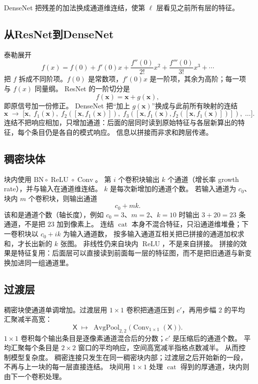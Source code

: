 DenseNet 把残差的加法换成通道维连结，使第 $\ell$ 层看见之前所有层的特征。

\subsection{从ResNet到DenseNet}

泰勒展开
\[
f(x)=f(0)+f'(0)x+\frac{f''(0)}{2!}x^{2}+\frac{f'''(0)}{3!}x^{3}+\cdots
\]
把 $f$ 拆成不同阶项。$f(0)$ 是常数项，$f'(0)x$ 是一阶项，其余为高阶；每一项与 $f(x)$ 同量纲。
ResNet 的一阶切分是
\[
f(\bm{x})=\bm{x}+g(\bm{x}),
\]
即原信号加一份修正。
DenseNet 把“加上 $g(\bm{x})$”换成与此前所有映射的连结
\[
\bm{x}
\;\longrightarrow\;
\bigl[
\bm{x},\;
f_1(\bm{x}),\;
f_2([\bm{x},f_1(\bm{x})]),\;
f_3([\bm{x},f_1(\bm{x}),f_2([\bm{x},f_1(\bm{x})])]),\;
\ldots
\bigr].
\]
连结不把响应相加，只增加通道：后面的层同时读到原始特征与各层新算出的特征，每个条目仍是各自的模式响应。
信息以拼接而非求和跨层传递。

\subsection{稠密块体}

块内使用 $\mathrm{BN}\circ\operatorname{ReLU}\circ\operatorname{Conv}$。
第 $i$ 个卷积块输出 $k$ 个通道（增长率 growth rate），并与输入在通道维连结。
$k$ 是每次新增加的通道个数。
若输入通道为 $c_0$、块内 $m$ 个卷积块，则输出通道
\[
c_0+m k.
\]
该和是通道个数（轴长度），例如 $c_0=3$、$m=2$、$k=10$ 时输出 $3+20=23$ 条通道，不是把 $23$ 加到像素上。
连结 $\operatorname{cat}$ 本身不混合特征，只沿通道维堆叠；下一卷积块以 $c_0+ik$ 为输入通道数，
按多输入通道互相关把已拼接的通道加权求和，才长出新的 $k$ 张图。
非线性仍来自块内 $\operatorname{ReLU}$，不是来自拼接。
拼接的效果是特征复用：后面层可以直接读到前面每一层的特征图，而不是把旧通道与新变换加进同一组通道里。

\subsection{过渡层}

稠密块使通道单调增加。过渡层用 $1\times 1$ 卷积把通道压到 $c'$，再用步幅 $2$ 的平均汇聚减半高宽：
\[
\mathsf{X}
\;\mapsto\;
\operatorname{AvgPool}_{2,2}\bigl(\operatorname{Conv}_{1\times 1}(\mathsf{X})\bigr).
\]
$1\times 1$ 卷积每个输出条目是逐像素通道混合后的分数；$c'$ 是压缩后的通道个数。
平均汇聚每个条目是 $2\times 2$ 窗口的平均响应，空间高宽减半指格点数减半。
从而控制模型复杂度。
稠密连接只发生在同一稠密块内部；过渡层之后开始新的一段，不再与上一块的每一层直接连结。
块间用 $1\times 1$ 处理 $\operatorname{cat}$ 得到的厚通道，块内则由下一个卷积处理。

